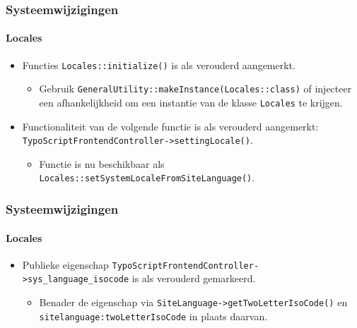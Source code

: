 \begin{frame}[fragile]
	\frametitle{Systeemwijzigingen}
	\framesubtitle{Locales}

	\begin{itemize}
		\item Functies \texttt{Locales::initialize()} is als verouderd aangemerkt.

			\begin{itemize}\smaller
				\item[\ding{228}] Gebruik \texttt{GeneralUtility::makeInstance(Locales::class)} of
				injecteer een afhankelijkheid om een instantie van de klasse \texttt{Locales} te krijgen.
			\end{itemize}\normalsize

		\item Functionaliteit van de volgende functie is als verouderd aangemerkt:\newline
			\texttt{TypoScriptFrontendController->settingLocale()}.

			\begin{itemize}\smaller
				\item[\ding{228}] Functie is nu beschikbaar als
				{\fontsize{8}{8} \selectfont \texttt{Locales::setSystemLocaleFromSiteLanguage()}.}
			\end{itemize}\normalsize

	\end{itemize}

\end{frame}


\begin{frame}[fragile]
	\frametitle{Systeemwijzigingen}
	\framesubtitle{Locales}

	\begin{itemize}
		\item Publieke eigenschap \texttt{TypoScriptFrontendController->sys\_language\_isocode}
			is als verouderd gemarkeerd.

			\begin{itemize}\smaller
				\item[\ding{228}] Benader de eigenschap via \texttt{SiteLanguage->getTwoLetterIsoCode()}
				en \texttt{sitelanguage:twoLetterIsoCode} in plaats daarvan.
			\end{itemize}\normalsize

	\end{itemize}

\end{frame}

